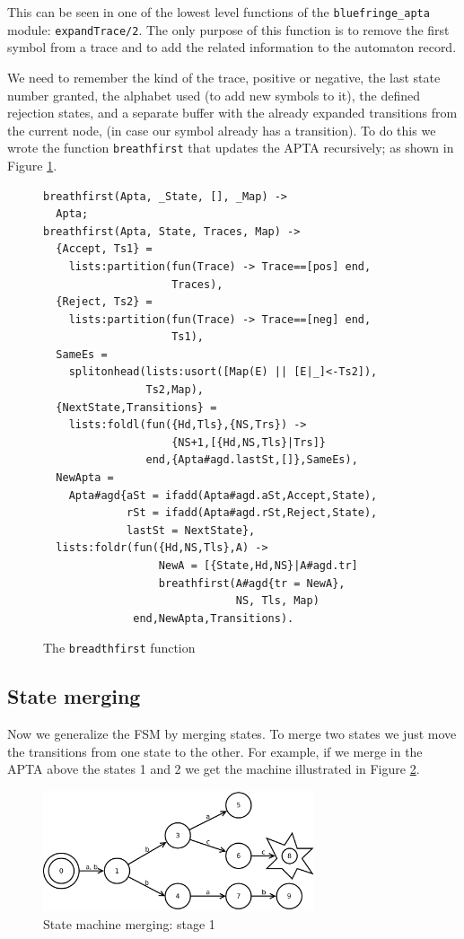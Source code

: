 \documentclass[]{sigplanconf}
\begin{document}
This can be seen in one of the lowest level functions of the
\texttt{bluefringe\_apta} module: \texttt{expandTrace/2}.
The only purpose of this function
is to remove the first symbol from a trace and to add the related 
information to the automaton record.

We need to  remember the kind of the trace, positive or negative, 
the last state number granted,
the alphabet used (to add new symbols to it), the defined
rejection states, and a separate buffer with the already expanded
transitions from the current node, (in case our symbol already
has a transition).
To do this we wrote the function \texttt{breathfirst} that
updates the APTA recursively; as shown in  Figure \ref{breadthfirst}.
\begin{figure}
\begin{verbatim}
breathfirst(Apta, _State, [], _Map) ->
  Apta;
breathfirst(Apta, State, Traces, Map) ->
  {Accept, Ts1} = 
    lists:partition(fun(Trace) -> Trace==[pos] end, 
                    Traces),
  {Reject, Ts2} = 
    lists:partition(fun(Trace) -> Trace==[neg] end, 
                    Ts1),
  SameEs = 
    splitonhead(lists:usort([Map(E) || [E|_]<-Ts2]),
                Ts2,Map),
  {NextState,Transitions} =
    lists:foldl(fun({Hd,Tls},{NS,Trs}) ->
                    {NS+1,[{Hd,NS,Tls}|Trs]}
                end,{Apta#agd.lastSt,[]},SameEs),
  NewApta =
    Apta#agd{aSt = ifadd(Apta#agd.aSt,Accept,State),
             rSt = ifadd(Apta#agd.rSt,Reject,State),
             lastSt = NextState},
  lists:foldr(fun({Hd,NS,Tls},A) ->
                  NewA = [{State,Hd,NS}|A#agd.tr]
                  breathfirst(A#agd{tr = NewA},
                              NS, Tls, Map)
              end,NewApta,Transitions).
\end{verbatim}
\caption{The \texttt{breadthfirst} function}
\label{breadthfirst}
\end{figure}

\subsection{State merging}

Now we generalize the FSM by merging states. To merge two
states we just move the transitions from one state to the other.
For example, if we merge in the APTA above the states 1 and 2
we get the machine illustrated in Figure \ref{fsm2}.

\begin{figure}
\begin{center}
\includegraphics[width=8cm]{pictures/fsm2.pdf}
\end{center}
\caption{State machine merging: stage 1}
\label{fsm2}
\end{figure}
\end{document}
